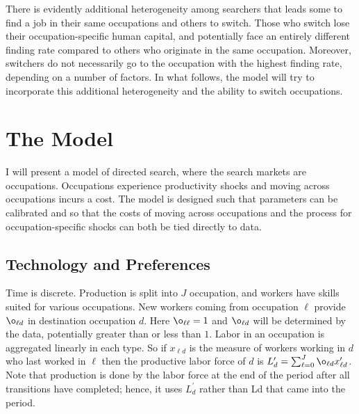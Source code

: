 \documentclass[12pt]{article}
\theoremstyle{definition}
\begin{document}
There is evidently additional heterogeneity among searchers that leads some to find a job in their same occupations and others to switch. Those who switch lose their occupation-specific human capital, and potentially face an entirely different finding rate compared to others who originate in the same occupation. Moreover, switchers do not necessarily go to the occupation with the highest finding rate, depending on a number of factors. In what follows, the model will try to incorporate this additional heterogeneity and the ability to switch occupations.

\section{The Model}

I will present a model of directed search, where the search markets are occupations. Occupations experience productivity shocks and moving across occupations incurs a cost. The model is designed such that parameters can be calibrated and so that the costs of moving across occupations and the process for occupation-specific shocks can both be tied directly to data.

\subsection{Technology and Preferences}

Time is discrete. Production is split into $J$ occupation, and workers have skills suited for various occupations. New workers coming from occupation $\ell$ provide $\o_{\ell d}$ in destination occupation $d$. Here $\o_{\ell\ell}=1$ and $\o_{\ell d}$ will be determined by the data, potentially greater than or less than $1$. Labor in an occupation is aggregated linearly in each type. So if $x_{\ell d}$ is the measure of workers working in $d$ who last worked in $\ell$ then the productive labor force of $d$ is $L_d^{\prime} = \sum_{\ell=0}^{J} \o_{\ell d} x_{\ell d}^{\prime}$. Note that production is done by the labor force at the end of the period after all transitions have completed; hence, it uses $L_d^{\prime}$ rather than Ld that came into the period.
\end{document}
